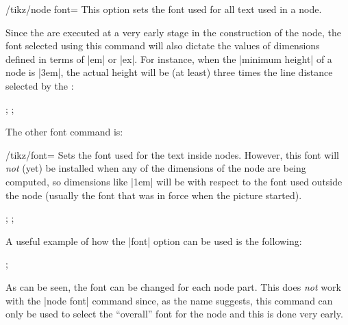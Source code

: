 \begin{key}{/tikz/node font=}
  This option sets the font used for all text used in a node. 
\begin{codeexample}[]
\end{codeexample}
  Since the  are executed at a very early stage in
  the construction of the node, the font selected using this command
  will also dictate the values of dimensions defined in terms of |em|
  or |ex|. For instance, when the |minimum height| of a node is |3em|,
  the actual height will be (at least) three times the line distance
  selected by the :
\begin{codeexample}[]
\tikz {};
\tikz {};
\end{codeexample}
\end{key}

The other font command is:

\begin{key}{/tikz/font=}
  Sets the font used for the text inside nodes. However, this font
  will \emph{not} (yet) be installed when any of the dimensions of the
  node are being computed, so dimensions like |1em| will be with
  respect to the font used outside the node (usually the font that was
  in force when the picture started). 
\begin{codeexample}[]
\end{codeexample}

\begin{codeexample}[]
\tikz {};
\tikz {};
\end{codeexample}

  A useful example of how the |font| option can be used is the
  following: 

\begin{codeexample}[]
\tikz [every text node part/.style={font=\itshape},
       every lower node part/.style={font=\footnotesize}]
  ;
\end{codeexample}

  As can be seen, the font can be changed for each node part. This
  does \emph{not} work with the |node font| command since, as the name
  suggests, this command can only be used to select the ``overall''
  font for the node and this is done very early. 
\end{key}


